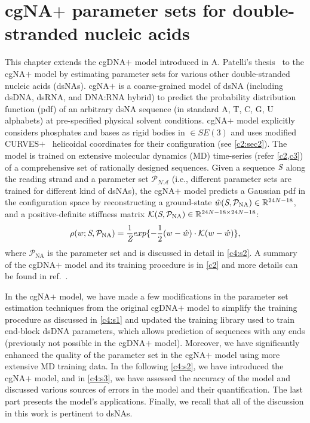 \chapter{cgNA$+$ parameter sets for double-stranded nucleic acids}\label{c4}

This chapter extends the cgDNA$+$ model introduced in A. Patelli's thesis~\cite{patelithesis} to the cgNA$+$ model by estimating parameter sets for various other double-stranded nucleic acids (dsNAs).
cgNA$+$ is a coarse-grained model of dsNA (including dsDNA, dsRNA, and DNA:RNA hybrid) to predict the probability distribution function (pdf) of an arbitrary dsNA sequence (in standard A, T, C, G, U alphabets) at pre-specified physical solvent conditions.
cgNA$+$ model explicitly considers phosphates and bases as rigid bodies in $\in SE(3)$ and uses modified CURVES$+$~\cite{curveplus} helicoidal coordinates for their configuration (see \cref{c2:sec2}).
The model is trained on extensive molecular dynamics (MD) time-series (refer \cref{c2,c3}) of a comprehensive set of rationally designed sequences.
Given a sequence ${\textit{S}}$ along the reading strand and a parameter set $\mathcal{P_{\text{NA}}}$ (i.e., different parameter sets are trained for different kind of dsNAs), the cgNA$+$ model predicts a Gaussian pdf in the configuration space by reconstructing a ground-state $\hat{w} ({\textit{S}}, \mathcal{P_{\text{NA}}}) \in {\mathbb R}^{24N-18}$, and a positive-definite stiffness matrix ${\mathcal K} ({\textit{S}}, \mathcal{P_{\text{NA}}}) \in {\mathbb R}^{24N-18 \times 24N-18}$:
\begin{equation}
\rho(w; {\textit{S}}, \mathcal{P_{\text{NA}}}) = \frac{1}{\textit{Z}} exp \{-\frac{1}{2}(w-\hat{w})\cdot {\mathcal K} (w-\hat{w})\},
\label{c4:eq1}
\end{equation} 
where $\mathcal{P}_{\text{NA}}$ is the parameter set and is discussed in detail in \cref{c4:s2}.
A summary of the cgDNA$+$ model and its training procedure is in \cref{c2} and more details  can be found in ref.~\cite{patelithesis}.

In the cgNA$+$ model, we have made a few modifications in the parameter set estimation techniques from the original cgDNA$+$ model to simplify the training procedure as discussed in \cref{c4:s1} and updated the training library used to train end-block dsDNA parameters, which allows prediction of sequences with any ends (previously not possible in the cgDNA$+$ model).
Moreover, we have significantly enhanced the quality of the parameter set in the cgNA$+$ model using more extensive MD training data.
In the following \cref{c4:s2}, we have introduced the cgNA$+$ model, and in \cref{c4:s3}, we have assessed the accuracy of the model and discussed various sources of errors in the model and their quantification.
The last part presents the model's applications.
Finally, we recall that all of the discussion in this work is pertinent to dsNAs. 

